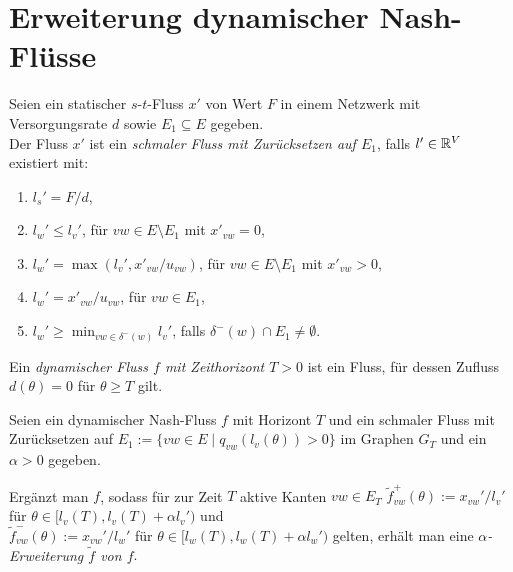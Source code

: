 \section{Erweiterung dynamischer Nash-Flüsse}

\begin{frame}\begin{definition}\label{def-thin-flow}
		Seien ein statischer $s$-$t$-Fluss  $x'$ von Wert $F$ in einem Netzwerk mit Versorgungsrate $d$ sowie $E_1\subseteq E$ gegeben. \\
		Der Fluss $x'$ ist ein \emph{schmaler Fluss mit Zurücksetzen auf $E_1$}, falls $l'\in\mathbb{R}^V$ existiert mit:
		\begin{enumerate}[label=(T\arabic*)]
			\item\label{def-thin-flow-source} $l_s' = F/d$,
			\item\label{def-thin-flow-x-zero} $l_w' \leq l_v'$, \tabto{5cm} für $vw\in E \setminus E_1$ mit $x'_{vw}=0$,
			\item\label{def-thin-flow-x-positive} $l_w' = \max(l_v', x'_{vw} / u_{vw} )$,  \tabto{5cm} für $vw\in E\setminus E_1$ mit $x'_{vw} > 0$,
			\item\label{def-thin-flow-resetting-edge} $l_w' = x'_{vw} / u_{vw}$,  \tabto{5cm} für $vw\in E_1$,
			\item\label{def-thin-flow-no-resetting-edge} $l_w' \geq \min_{vw\in \delta^-(w)} l_v'$, \tabto{5cm} falls $\delta^-(w)\cap E_1 \neq \emptyset$.
		\end{enumerate}
	\end{definition}
\end{frame}

\begin{frame}
	\begin{definition}
		Ein \emph{dynamischer Fluss $f$ mit Zeithorizont $T>0$} ist ein Fluss, für dessen Zufluss $d(\theta)= 0$ für $\theta\geq T$ gilt.
	\end{definition}

	\begin{definition}
		Seien ein dynamischer Nash-Fluss $f$ mit Horizont $T$ und ein schmaler Fluss mit Zurücksetzen auf $E_1 := \{ vw\in E \mid q_{vw}(l_v(\theta)) > 0 \}$ im Graphen $G_T$ und ein $\alpha > 0$ gegeben.
		
		Ergänzt man $f$, sodass für zur Zeit $T$ aktive Kanten $vw\in E_T$
		$\tilde{f}_{vw}^+(\theta):= x_{vw}'/l_v'$ für $\theta\in [l_v(T), l_v(T)+\alpha l_v')$ und \\
		$\tilde{f}_{vw}^-(\theta):=x_{vw}'/l_w'$ für $\theta\in [l_w(T), l_w(T)+\alpha l_w')$
		gelten, erhält man eine \emph{$\alpha$-Erweiterung $\tilde{f}$ von $f$}.
	\end{definition}
\end{frame}


